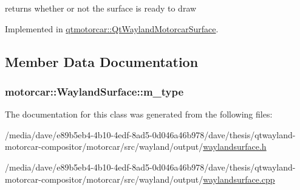 returns whether or not the surface is ready to draw 



Implemented in \hyperlink{classqtmotorcar_1_1QtWaylandMotorcarSurface_a3bea85a2a6a3079e60c3b37dd08aebc6}{qtmotorcar\-::\-Qt\-Wayland\-Motorcar\-Surface}.



\subsection{Member Data Documentation}
\hypertarget{classmotorcar_1_1WaylandSurface_a73fc5c245e98a08a551c7f412fd95966}{
\subsubsection[{m\-\_\-type}]{ motorcar\-::\-Wayland\-Surface\-::m\-\_\-type\hspace{0.3cm}{\ttfamily [protected]}}}\label{classmotorcar_1_1WaylandSurface_a73fc5c245e98a08a551c7f412fd95966}


The documentation for this class was generated from the following files\-:\begin{DoxyCompactItemize}
\item 
/media/dave/e89b5eb4-\/4b10-\/4edf-\/8ad5-\/0d046a46b978/dave/thesis/qtwayland-\/motorcar-\/compositor/motorcar/src/wayland/output/\hyperlink{waylandsurface_8h}{waylandsurface.\-h}\item 
/media/dave/e89b5eb4-\/4b10-\/4edf-\/8ad5-\/0d046a46b978/dave/thesis/qtwayland-\/motorcar-\/compositor/motorcar/src/wayland/output/\hyperlink{waylandsurface_8cpp}{waylandsurface.\-cpp}\end{DoxyCompactItemize}
